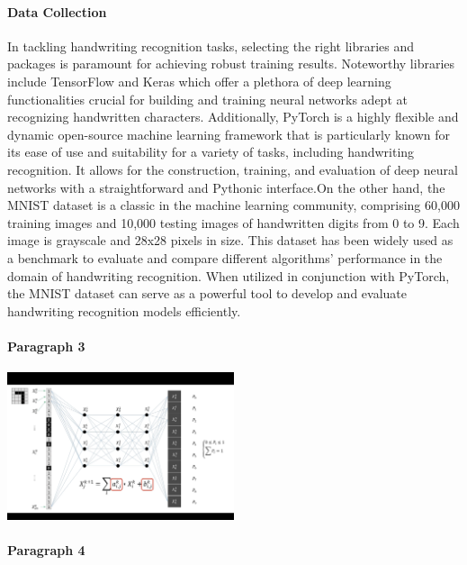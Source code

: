 \documentclass[12pt]{article}
\begin{document}
\paragraph{Data Collection}
In tackling handwriting recognition tasks, selecting the right libraries and packages is paramount for achieving robust training results. Noteworthy libraries include TensorFlow and Keras which offer a plethora of deep learning functionalities crucial for building and training neural networks adept at recognizing handwritten characters. Additionally, PyTorch is a highly flexible and dynamic open-source machine learning framework that is particularly known for its ease of use and suitability for a variety of tasks, including handwriting recognition. It allows for the construction, training, and evaluation of deep neural networks with a straightforward and Pythonic interface.On the other hand, the MNIST dataset is a classic in the machine learning community, comprising 60,000 training images and 10,000 testing images of handwritten digits from 0 to 9. Each image is grayscale and 28x28 pixels in size. This dataset has been widely used as a benchmark to evaluate and compare different algorithms' performance in the domain of handwriting recognition. When utilized in conjunction with PyTorch, the MNIST dataset can serve as a powerful tool to develop and evaluate handwriting recognition models efficiently. 
\paragraph{Paragraph 3}
\includegraphics[width=0.5\textwidth]{Image1.png}
\paragraph{Paragraph 4}




\cite{824821}
\cite{NIPS2008_66368270}
\cite{6981034}
\end{document}
